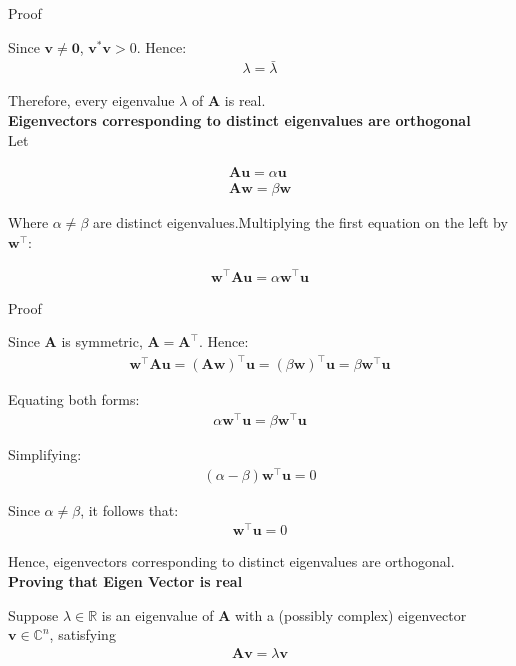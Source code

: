 \documentclass{beamer}
\numberwithin{equation}{section}
\theoremstyle{remark}
\let\vec\mathbf
\begin{document}
\begin{frame}{Proof}

Since $\vec{v} \ne \vec{0}$, $\vec{v}^*\vec{v} > 0$. Hence:
\begin{align}
\lambda = \bar{\lambda}
\end{align}

Therefore, every eigenvalue $\lambda$ of $\vec{A}$ is real.\\

\textbf{Eigenvectors corresponding to distinct eigenvalues are orthogonal}\\

Let

\begin{align}
\vec{A}\vec{u} = \alpha \vec{u}\\
\vec{A}\vec{w} = \beta \vec{w}
\end{align}

Where $\alpha \ne \beta$ are distinct eigenvalues.Multiplying the first equation on the left by $\vec{w}^\top$:

\begin{align}
\vec{w}^\top \vec{A} \vec{u} = \alpha \vec{w}^\top \vec{u}
\end{align}

\end{frame}

\begin{frame}{Proof}

Since $\vec{A}$ is symmetric, $\vec{A} = \vec{A}^\top$. Hence:
\begin{align}
\vec{w}^\top \vec{A}\vec{u} = (\vec{A}\vec{w})^\top \vec{u} = (\beta \vec{w})^\top \vec{u} = \beta \vec{w}^\top \vec{u}
\end{align}

Equating both forms:
\begin{align}
\alpha \vec{w}^\top \vec{u} = \beta \vec{w}^\top \vec{u}
\end{align}

Simplifying:
\begin{align}
(\alpha - \beta) \vec{w}^\top \vec{u} = 0
\end{align}

Since $\alpha \ne \beta$, it follows that:
\begin{align}
\vec{w}^\top \vec{u} = 0
\end{align}

Hence, eigenvectors corresponding to distinct eigenvalues are orthogonal.\\

\textbf{Proving that Eigen Vector is real}

Suppose $\lambda \in \mathbb{R}$ is an eigenvalue of $\vec{A}$ with a (possibly complex) eigenvector $\vec{v} \in \mathbb{C}^n$, satisfying
\begin{align}
\vec{A}\vec{v} = \lambda \vec{v}
\end{align}

\end{frame}
\end{document}

